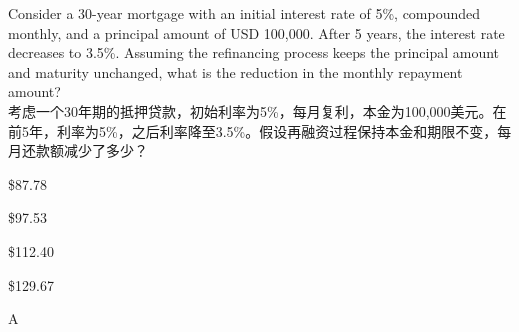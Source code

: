 \documentclass{article}
\newcounter{question} %
\begin{document}
            \begin{question}
                Consider a 30-year mortgage with an initial interest rate of 5\%, compounded monthly, and a principal amount of USD 100,000. After 5 years, the interest rate decreases to 3.5\%. Assuming the refinancing process keeps the principal amount and maturity unchanged, what is the reduction in the monthly repayment amount?\\
                考虑一个30年期的抵押贷款，初始利率为5\%，每月复利，本金为100,000美元。在前5年，利率为5\%，之后利率降至3.5\%。假设再融资过程保持本金和期限不变，每月还款额减少了多少？
                \end{question}
                
                \begin{choices}
                    \item \$87.78
                    \item \$97.53
                    \item \$112.40
                    \item \$129.67
                \end{choices}
                
                \begin{correctanswer}
               A
                \end{correctanswer}
                
\end{document}
